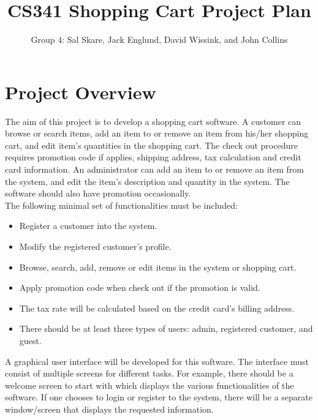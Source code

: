 \documentclass[10pt,letter]{article}
\begin{document}

\title{CS341 Shopping Cart Project Plan}

\author{Group 4: Sal Skare, Jack Englund, David Wissink, and John Collins}

\maketitle 

\section*{Project Overview} The aim of this project is to develop a shopping cart software. A customer can browse or
search items, add an item to or remove an item from his/her shopping cart, and edit item’s
quantities in the shopping cart. The check out procedure requires promotion code if
applies, shipping address, tax calculation and credit card information. An administrator
can add an item to or remove an item from the system, and edit the item’s description and
quantity in the system. The software should also have promotion occasionally.
\\
The following minimal set of functionalities must be included:
\begin{itemize}
    \item Register a customer into the system.
    \item Modify the registered customer’s profile.
    \item Browse, search, add, remove or edit items in the system or shopping cart.
    \item Apply promotion code when check out if the promotion is valid.
    \item The tax rate will be calculated based on the credit card’s billing address.
    \item There should be at least three types of users: admin, registered customer, and guest.
\end{itemize}

\par A graphical user interface will be developed for this software. The interface must consist
of multiple screens for different tasks. For example, there should be a welcome screen to
start with which displays the various functionalities of the software. If one chooses to
login or register to the system, there will be a separate window/screen that displays the
requested information. 
\end{document}
